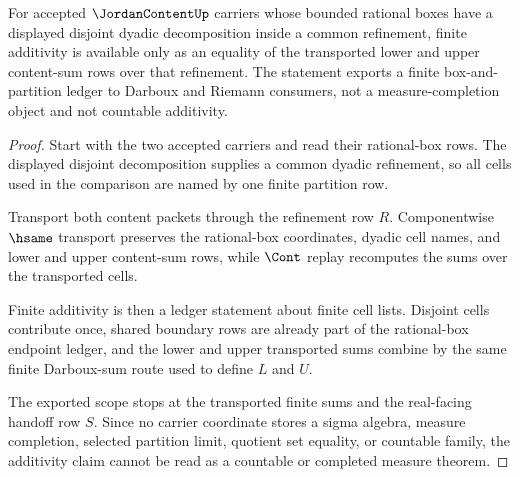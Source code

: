 \begin{theorem}
\label{thm:jordan-content-finite-additivity-scope}
For accepted $\JordanContentUp$ carriers whose bounded rational boxes have a displayed disjoint dyadic decomposition inside a common refinement, finite additivity is available only as an equality of the transported lower and upper content-sum rows over that refinement. The statement exports a finite box-and-partition ledger to Darboux and Riemann consumers, not a measure-completion object and not countable additivity.
\end{theorem}
\begin{proof}
Start with the two accepted carriers and read their rational-box rows. The displayed disjoint decomposition supplies a common dyadic refinement, so all cells used in the comparison are named by one finite partition row.

Transport both content packets through the refinement row $R$. Componentwise $\hsame$ transport preserves the rational-box coordinates, dyadic cell names, and lower and upper content-sum rows, while $\Cont$ replay recomputes the sums over the transported cells.

Finite additivity is then a ledger statement about finite cell lists. Disjoint cells contribute once, shared boundary rows are already part of the rational-box endpoint ledger, and the lower and upper transported sums combine by the same finite Darboux-sum route used to define $L$ and $U$.

The exported scope stops at the transported finite sums and the real-facing handoff row $S$. Since no carrier coordinate stores a sigma algebra, measure completion, selected partition limit, quotient set equality, or countable family, the additivity claim cannot be read as a countable or completed measure theorem.
\end{proof}


\begin{closurestatus}{\JordanContentUp}
  \theoryclosure{\seedClosure}
  \formalstatus{\unformalizedV}
\end{closurestatus}
